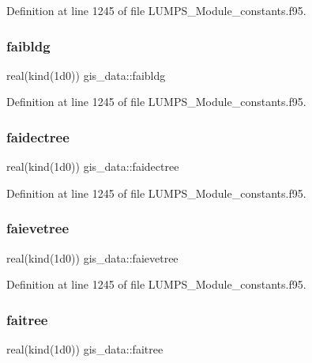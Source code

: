 Definition at line 1245 of file L\+U\+M\+P\+S\+\_\+\+Module\+\_\+constants.\+f95.

\mbox{\label{namespacegis__data_a23e18e9f568ef5a47ed3b37826c9f7f3}} 
\subsubsection{\texorpdfstring{faibldg}{faibldg}}
{\footnotesize\ttfamily real(kind(1d0)) gis\+\_\+data\+::faibldg}



Definition at line 1245 of file L\+U\+M\+P\+S\+\_\+\+Module\+\_\+constants.\+f95.

\mbox{\label{namespacegis__data_ae57a4a8a22280d3953006ba6e242c5be}} 
\subsubsection{\texorpdfstring{faidectree}{faidectree}}
{\footnotesize\ttfamily real(kind(1d0)) gis\+\_\+data\+::faidectree}



Definition at line 1245 of file L\+U\+M\+P\+S\+\_\+\+Module\+\_\+constants.\+f95.

\mbox{\label{namespacegis__data_a78a214dccb2ce0e8d532e514bd05927f}} 
\subsubsection{\texorpdfstring{faievetree}{faievetree}}
{\footnotesize\ttfamily real(kind(1d0)) gis\+\_\+data\+::faievetree}



Definition at line 1245 of file L\+U\+M\+P\+S\+\_\+\+Module\+\_\+constants.\+f95.

\mbox{\label{namespacegis__data_ae72d3a579ecf2a355591ca6eb2e69e7a}} 
\subsubsection{\texorpdfstring{faitree}{faitree}}
{\footnotesize\ttfamily real(kind(1d0)) gis\+\_\+data\+::faitree}



